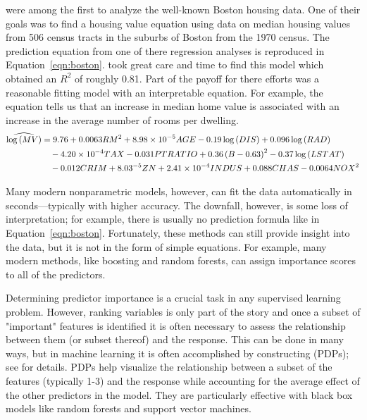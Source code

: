 \citet{harrison-1978-hedonic} were among the first to analyze the well-known Boston housing data. One of their goals was to find a housing value equation using data on median housing values from 506 census tracts in the suburbs of Boston from the 1970 census. The prediction equation from one of there regression analyses is reproduced in Equation~\eqref{eqn:boston}. \citet{harrison-1978-hedonic} took great care and time to find this model which obtained an $R^2$ of roughly 0.81. Part of the payoff for there efforts was a reasonable fitting model with an interpretable equation. For example, the equation tells us that an increase in median home value is associated with an increase in the average number of rooms per dwelling.
\begin{equation}
\label{eqn:boston}
\begin{split}
\widehat{\log\left(MV\right)} &= 9.76 + 0.0063 RM^2 + 8.98\times10^{-5} AGE - 0.19\log\left(DIS\right) + 0.096\log\left(RAD\right) \\
  &\quad - 4.20\times10^{-4} TAX - 0.031 PTRATIO + 0.36\left(B - 0.63\right)^2 - 0.37\log\left(LSTAT\right) \\
  &\quad - 0.012 CRIM + 8.03\time10^{-5} ZN + 2.41\times10^{-4} INDUS + 0.088 CHAS - 0.0064 NOX^2
\end{split}
\end{equation}

Many modern nonparametric models, however, can fit the data automatically in seconds---typically with higher accuracy. The downfall, however, is some loss of interpretation; for example, there is usually no prediction formula like in Equation~\eqref{eqn:boston}. Fortunately, these methods can still provide insight into the data, but it is not in the form of simple equations. For example, many modern methods, like boosting and random forests, can assign importance scores to all of the predictors.

Determining predictor importance is a crucial task in any supervised learning problem. However, ranking variables is only part of the story and once a subset of "important" features is identified it is often necessary to assess the relationship between them (or subset thereof) and the response. This can be done in many ways, but in machine learning it is often accomplished by constructing  (PDPs); see \citet{friedman-2000-greedy} for details. PDPs help visualize the relationship between a subset of the features (typically 1-3) and the response while accounting for the average effect of the other predictors in the model. They are particularly effective with black box models like random forests and support vector machines.

